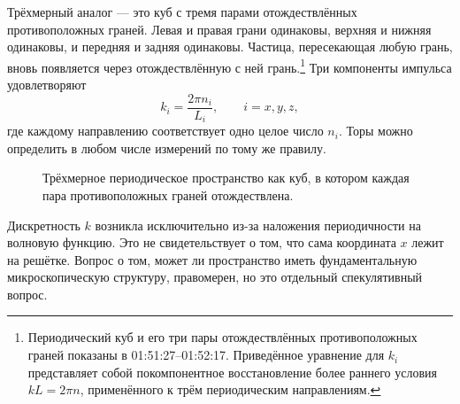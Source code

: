 Трёхмерный аналог — это куб с тремя парами отождествлённых противоположных граней. Левая и правая грани одинаковы, верхняя и нижняя одинаковы, и передняя и задняя одинаковы. Частица, пересекающая любую грань, вновь появляется через отождествлённую с ней грань.\footnote{Периодический куб и его три пары отождествлённых противоположных граней показаны в 01:51:27--01:52:17. Приведённое уравнение для \(k_i\) представляет собой покомпонентное восстановление более раннего условия \(kL=2\pi n\), применённого к трём периодическим направлениям.} Три компоненты импульса удовлетворяют
\begin{equation}
k_i=\frac{2\pi n_i}{L_i},
\qquad i=x,y,z,
\end{equation}
где каждому направлению соответствует одно целое число \(n_i\). Торы можно определить в любом числе измерений по тому же правилу.

\begin{figure}[t]
\centering
{}
\caption{Трёхмерное периодическое пространство как куб, в котором каждая пара противоположных граней отождествлена.}
\end{figure}

\begin{classroomqa}
\end{classroomqa}


Дискретность \(k\) возникла исключительно из-за наложения периодичности на волновую функцию. Это не свидетельствует о том, что сама координата \(x\) лежит на решётке. Вопрос о том, может ли пространство иметь фундаментальную микроскопическую структуру, правомерен, но это отдельный спекулятивный вопрос.

